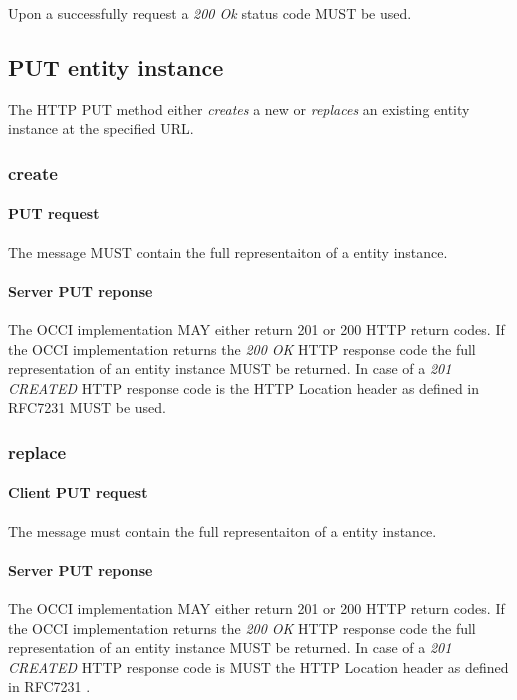 \documentclass[10pt,a4paper]{article}
\begin{document}
Upon a successfully request a \emph{200 Ok} status code MUST be used.

\subsection{PUT entity instance}
The HTTP PUT method either {\em creates} a new or {\em replaces} an existing entity instance at the specified URL.

\subsubsection{create}

\paragraph{PUT request}
The message MUST contain the full representaiton of a entity instance.

\paragraph{Server PUT reponse}
The OCCI implementation MAY either return 201 or 200 HTTP return codes. If the OCCI implementation
returns the \emph{200 OK} HTTP response code the full representation of an entity instance MUST be returned. 
In case of a \emph{201 CREATED} HTTP response code is the HTTP Location header as defined in RFC7231 \cite{rfc7231} MUST be used.

\subsubsection{replace}

\paragraph{Client PUT request}
The message must contain the full representaiton of a entity instance.

\paragraph{Server PUT reponse}
The OCCI implementation MAY either return 201 or 200 HTTP return codes. If the OCCI implementation
returns the \emph{200 OK} HTTP response code the full representation of an entity instance MUST be returned. 
In case of a \emph{201 CREATED} HTTP response code is MUST the HTTP Location header as defined in RFC7231 \cite{rfc7231}.
\end{document}
